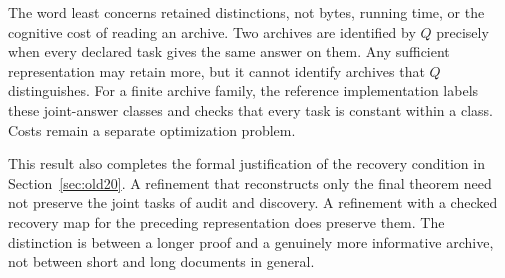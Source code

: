 The word least concerns retained distinctions, not bytes, running time, or the cognitive cost of reading an archive. Two archives are identified by $Q$ precisely when every declared task gives the same answer on them. Any sufficient representation may retain more, but it cannot identify archives that $Q$ distinguishes. For a finite archive family, the reference implementation labels these joint-answer classes and checks that every task is constant within a class. Costs remain a separate optimization problem.

This result also completes the formal justification of the recovery condition in Section~\ref{sec:old20}. A refinement that reconstructs only the final theorem need not preserve the joint tasks of audit and discovery. A refinement with a checked recovery map for the preceding representation does preserve them. The distinction is between a longer proof and a genuinely more informative archive, not between short and long documents in general.

